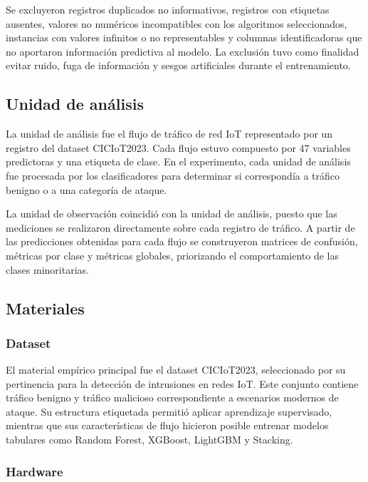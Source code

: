 \documentclass[12pt,a4paper]{article}
\begin{document}
Se excluyeron registros duplicados no informativos, registros con etiquetas ausentes, valores no numéricos incompatibles con los algoritmos seleccionados, instancias con valores infinitos o no representables y columnas identificadoras que no aportaron información predictiva al modelo. La exclusión tuvo como finalidad evitar ruido, fuga de información y sesgos artificiales durante el entrenamiento.

\subsection{Unidad de análisis}

La unidad de análisis fue el flujo de tráfico de red IoT representado por un registro del dataset CICIoT2023. Cada flujo estuvo compuesto por 47 variables predictoras y una etiqueta de clase. En el experimento, cada unidad de análisis fue procesada por los clasificadores para determinar si correspondía a tráfico benigno o a una categoría de ataque.

La unidad de observación coincidió con la unidad de análisis, puesto que las mediciones se realizaron directamente sobre cada registro de tráfico. A partir de las predicciones obtenidas para cada flujo se construyeron matrices de confusión, métricas por clase y métricas globales, priorizando el comportamiento de las clases minoritarias.

\subsection{Materiales}

\subsubsection{Dataset}

El material empírico principal fue el dataset CICIoT2023, seleccionado por su pertinencia para la detección de intrusiones en redes IoT. Este conjunto contiene tráfico benigno y tráfico malicioso correspondiente a escenarios modernos de ataque. Su estructura etiquetada permitió aplicar aprendizaje supervisado, mientras que sus características de flujo hicieron posible entrenar modelos tabulares como Random Forest, XGBoost, LightGBM y Stacking.

\subsubsection{Hardware}
\end{document}
